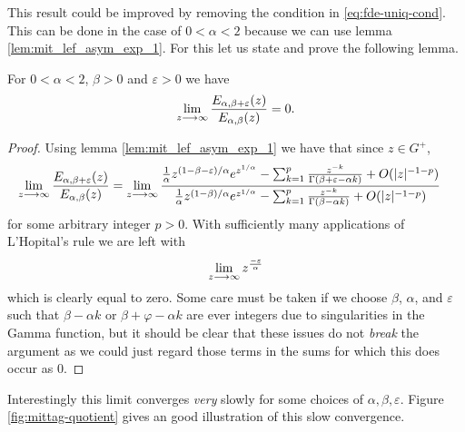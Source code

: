 This result could be improved by removing the condition  in \eqref{eq:fde-uniq-cond}. This can be done in the case of $ 0 < \alpha < 2 $ because we can use lemma \ref{lem:mit_lef_asym_exp_1}. For this let us state and prove the following lemma.

\begin{mdframed}[innertopmargin=10pt]
\begin{lemma}
	\label{lem:mit_lef_quotient}
	For $ 0 < \alpha < 2 $, $ \beta > 0 $ and $ \varepsilon > 0 $ we have
	\begin{align}
		\lim_{z \longrightarrow \infty} \frac{E_{\alpha, \beta + \varepsilon}(z)}{E_{\alpha, \beta}(z)} = 0.
	\end{align}
\end{lemma}
\end{mdframed}

\begin{proof}
	Using lemma \ref{lem:mit_lef_asym_exp_1} we have that since $ z \in G^+ $,
	\begin{align}
		\lim_{z \longrightarrow \infty} \frac{E_{\alpha, \beta + \varepsilon}(z)}{E_{\alpha, \beta}(z)} &= \lim_{z \longrightarrow \infty}\frac{\frac{1}{\alpha} z^{(1 - \beta - \varepsilon) / \alpha} e^{z^{1/\alpha}} - \sum_{k=1}^p \frac{z^{-k}}{\Gamma(\beta + \varepsilon - \alpha k)} + O(|z|^{-1-p})}{\frac{1}{\alpha} z^{(1 - \beta) / \alpha} e^{z^{1/\alpha}} - \sum_{k=1}^p \frac{z^{-k}}{\Gamma(\beta - \alpha k)} + O(|z|^{-1-p})}
	\end{align}
	for some arbitrary integer $ p > 0 $.
	With sufficiently many applications of L'Hopital's rule we are left with
	\begin{align}
		\lim_{z\longrightarrow\infty} z^{\frac{-\varepsilon}{\alpha}}		
	\end{align}
	which is clearly equal to zero.
	Some care must be taken if we choose $ \beta $, $ \alpha $, and $ \varepsilon $ such that $ \beta - \alpha k $ or $ \beta + \varphi - \alpha k $ are ever integers due to singularities in the Gamma function, but it should be clear that these issues do not \emph{break} the argument as we could just regard those terms in the sums for which this does occur as $ 0 $.
\end{proof}

Interestingly this limit converges \emph{very} slowly for some choices of $ \alpha, \beta, \varepsilon $. Figure \ref{fig:mittag-quotient} gives an good illustration of this slow convergence.

